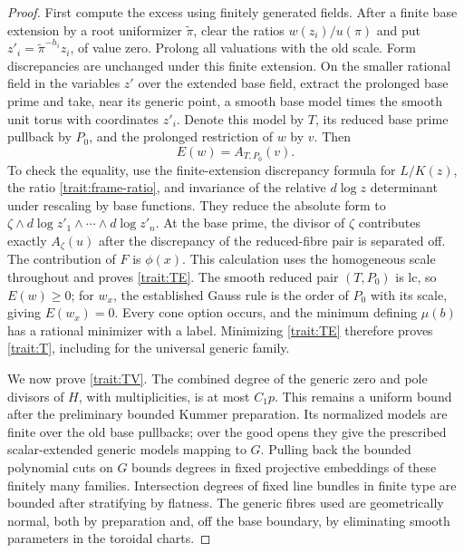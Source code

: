 \begin{proof}
First compute the excess using finitely generated fields.
After a finite base extension by a root uniformizer
\(\widetilde\pi\), clear the ratios
\(w(z_i)/u(\pi)\) and put
\(z'_i=\widetilde\pi^{-h_i}z_i\), of value zero.
Prolong all valuations with the old scale.  Form
discrepancies are unchanged under this finite extension.
On the smaller rational field in the variables \(z'\)
over the extended base field, extract the prolonged base
prime and take, near its generic point, a smooth base
model times the smooth unit torus with coordinates
\(z'_i\).  Denote this model by \(T\), its reduced base
prime pullback by \(P_0\), and the prolonged restriction
of \(w\) by \(v\).  Then
\begin{equation}
 E(w)=A_{T,P_0}(v).
 \label{trait:excess-torus}
\end{equation}
To check the equality, use the finite-extension discrepancy
formula for \(L/K(z)\), the ratio
\eqref{trait:frame-ratio}, and invariance of the relative
\(d\log z\) determinant under rescaling by base
functions.  They reduce the absolute form to
\(\zeta\wedge d\log z'_1\wedge\cdots\wedge d\log z'_n\).
At the base prime, the divisor of \(\zeta\) contributes
exactly \(A_\zeta(u)\) after the discrepancy of the
reduced-fibre pair is separated off.  The contribution of
\(F\) is \(\phi(x)\).  This calculation uses the
homogeneous scale throughout and proves
\eqref{trait:TE}.  The smooth reduced pair \((T,P_0)\)
is lc, so \(E(w)\ge0\); for \(w_x\), the established
Gauss rule is the order of \(P_0\) with its scale,
giving \(E(w_x)=0\).  Every cone option occurs, and the
minimum defining \(\mu(b)\) has a rational minimizer
with a label.  Minimizing \eqref{trait:TE} therefore
proves \eqref{trait:T}, including for the universal
generic family.

We now prove \eqref{trait:TV}.  The combined degree of
the generic zero and pole divisors of \(H\), with
multiplicities, is at most \(C_1p\).  This remains a
uniform bound after the preliminary bounded Kummer
preparation.  Its normalized models are finite over
the old base pullbacks; over the good opens they give
the prescribed scalar-extended generic models mapping
to \(G\).  Pulling back the bounded polynomial cuts
on \(G\) bounds degrees in fixed projective embeddings
of these finitely many families.  Intersection degrees
of fixed line bundles in finite type are bounded after
stratifying by flatness.  The generic fibres used are
geometrically normal, both by preparation and, off the
base boundary, by eliminating smooth parameters in
the toroidal charts.


\end{proof}
